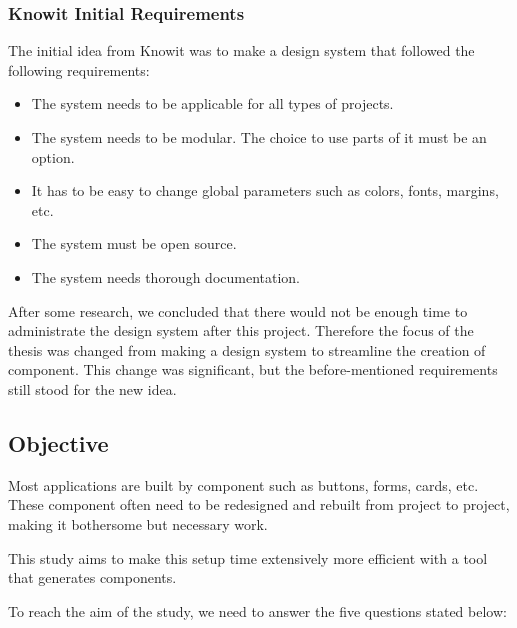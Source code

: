 \subsubsection{Knowit Initial Requirements}%
\label{ssub:Knowit Initial Requirements}
The initial idea from Knowit was to make a design system\cite{fanguyComprehensiveGuideDesign} that followed the following requirements:
\begin{itemize}
  \item The system needs to be applicable for all types of projects.
  \item The system needs to be modular. The choice to use parts of it must be an option.
  \item It has to be easy to change global parameters such as colors, fonts, margins, etc.
  \item The system must be open source.
  \item The system needs thorough documentation.
\end{itemize}

After some research, we concluded that there would not be enough time to administrate the design system after this project. Therefore the focus of the thesis was changed from making a design system to streamline the creation of \gls{component}. This change was significant, but the before-mentioned requirements still stood for the new idea. 




\subsection{Objective}
\label{sub:Objective}
Most applications are built by \gls{component} such as buttons, forms, cards\cite{babichSimpleDesignTips2020}, etc. These \gls{component} often need to be redesigned and rebuilt from project to project, making it bothersome but necessary work. 

This study aims to make this setup time extensively more efficient with a tool that generates \glspl{component}. 

To reach the aim of the study, we need to answer the five questions stated below:  

